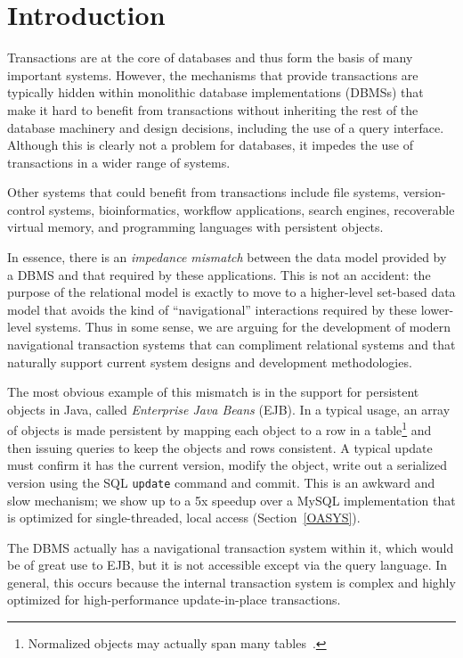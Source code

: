 \documentclass[10pt,letterpaper,twocolumn,english]{article}
\begin{document}
\vspace*{-18pt}


\section{Introduction}

Transactions are at the core of databases and thus form the basis of many
important systems. However, the mechanisms that provide transactions are
typically hidden within monolithic database implementations (DBMSs) that make
it hard to benefit from transactions without inheriting the rest of
the database machinery and design decisions, including the use of a
query interface.  Although this is clearly not a problem for
databases, it impedes the use of transactions in a wider range of
systems.

Other systems that could benefit from transactions include file
systems, version-control systems, bioinformatics, workflow
applications, search engines, recoverable virtual memory, and
programming languages with persistent objects.

In essence, there is an {\em impedance mismatch} between the data
model provided by a DBMS and that required by these applications. This is
not an accident: the purpose of the relational model is exactly to
move to a higher-level set-based data model that avoids the kind of
``navigational'' interactions required by these lower-level systems.
Thus in some sense, we are arguing for the development of modern
navigational transaction systems that can compliment relational systems 
and that naturally support current system designs and development methodologies.

The most obvious example of this mismatch is in the support for
persistent objects in Java, called {\em Enterprise Java Beans}
(EJB). In a typical usage, an array of objects is made persistent by
mapping each object to a row in a table\footnote{Normalized objects may actually span many tables~\cite{hibernate}.}  and then issuing queries to keep the
objects and rows consistent. A typical update must confirm it has the
current version, modify the object, write out a serialized version
using the SQL {\tt update} command and commit.  This is an awkward
and slow mechanism; we show up to a 5x speedup over a MySQL implementation 
that is optimized for single-threaded, local access (Section~\ref{OASYS}).

The DBMS actually has a navigational transaction system within it,
which would be of great use to EJB, but it is not accessible except
via the query language.  In general, this occurs because the internal
transaction system is complex and highly optimized for
high-performance update-in-place transactions.
\end{document}

